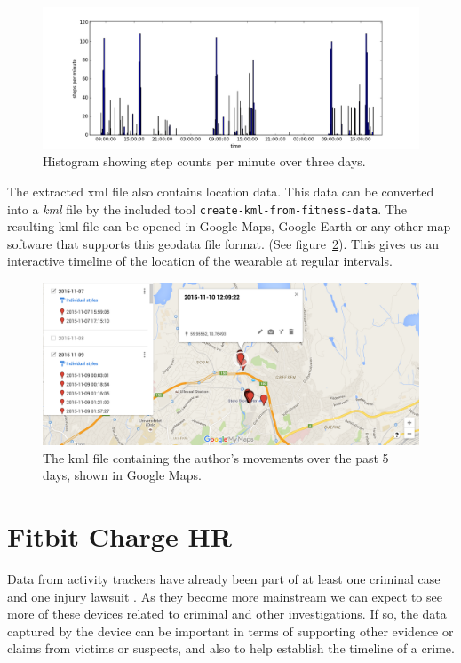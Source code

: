 \documentclass[a4paper,11pt,dvips]{article}
\begin{document}
\begin{figure}
\noindent
\includegraphics[natwidth=1355bp,natheight=512bp,width=\linewidth]{stepcount}
\caption{Histogram showing step counts per minute over three days.}
\label{fig:stepcount}
\end{figure}

The extracted xml file also contains location data. This data can be converted into a \textit{kml} file by the included tool \texttt{create-kml-from-fitness-data}. The resulting kml file can be opened in Google Maps, Google Earth or any other map software that supports this geodata file format. (See figure~\ref{fig:geodata}). This gives us an interactive timeline of the location of the wearable at regular intervals.

\begin{figure}
\noindent
\includegraphics[natwidth=2096bp,natheight=906bp,width=\linewidth]{geodata}
\caption{The kml file containing the author's movements over the past 5 days, shown in Google Maps.}
\label{fig:geodata}
\end{figure}


\section{Fitbit Charge HR}

Data from activity trackers have already been part of at least one criminal case \citep{Snyder:2015} and one injury lawsuit \citep{Olson:2014}. As they become more mainstream we can expect to see more of these devices related to criminal and other investigations. If so, the data captured by the device can be important in terms of supporting other evidence or claims from victims or suspects, and also to help establish the timeline of a crime.
\end{document}
